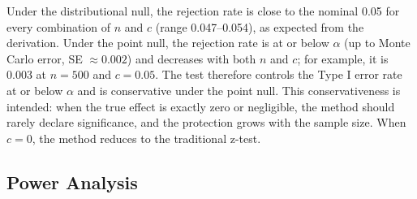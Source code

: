\documentclass[
  11pt,
  letterpaper,
]{article}
\begin{document}
\begin{table}

\caption{\label{tbl-type1}Rejection rates of the uncertainty-adjusted
test at \(\alpha = 0.05\) under the point null and the distributional
null (10,000 simulations per scenario)}


\end{table}%

Under the distributional null, the rejection rate is close to the
nominal 0.05 for every combination of \(n\) and \(c\) (range
0.047--0.054), as expected from the derivation. Under the point null,
the rejection rate is at or below \(\alpha\) (up to Monte Carlo error,
SE \(\approx 0.002\)) and decreases with both \(n\) and \(c\); for
example, it is 0.003 at \(n = 500\) and \(c = 0.05\). The test therefore
controls the Type I error rate at or below \(\alpha\) and is
conservative under the point null. This conservativeness is intended:
when the true effect is exactly zero or negligible, the method should
rarely declare significance, and the protection grows with the sample
size. When \(c = 0\), the method reduces to the traditional z-test.

\subsection{Power Analysis}\label{power-analysis}
\end{document}
